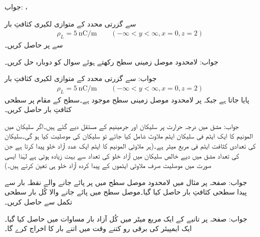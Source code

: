 جواب: ، 


 سے گزرتی  محدد کے متوازی لکیری کثافتِ بار
\begin{align*}
\rho_L=\SI{5}{\nano \coulomb \per \meter}  \quad \quad (-\infty < y < \infty, x=0,z=2)
\end{align*} 
سے  پر  حاصل کریں۔

جواب:
لامحدود موصل زمینی سطح   رکھتے ہوئے  سوال  کو دوبارہ حل کریں۔

جواب:
 سے گزرتی  محدد کے متوازی لکیری کثافتِ بار
\begin{align*}
\rho_L=\SI{5}{\nano \coulomb \per \meter}  \quad \quad (-\infty < y < \infty, x=0,z=2)
\end{align*} 
پایا جاتا ہے جبکہ  پر لامحدود موصل زمینی سطح موجود ہے۔سطح کے  مقام پر سطحی کثافتِ بار حاصل کریں۔

جواب: 
مشق  میں  درجہ حرارت پر  سلیکان اور جرمینیم کے مستقل دیے گئے ہیں۔اگر سلیکان میں المونیم کا ایک ایٹم فی   سلیکان ایٹم  ملاوٹ شامل کیا جائے تو سلیکان کی موصلیت کیا ہو گی۔سلیکان کی تعدادی کثافت  ایٹم فی مربع میٹر ہے۔(ہر ملاوٹی المونیم کا  ایٹم ایک عدد آزاد خلو پیدا کرتا ہے جن  کی تعداد مشق میں دیے خالص سلیکان میں آزاد خلو کی تعداد سے بہت زیادہ ہوتی ہے لہٰذا ایسی صورت میں موصلیت صرف ملاوٹی ایٹموں کے پیدا کردہ آزاد خلو ہی تعین کرتے ہیں۔) 

جواب: 
صفحہ  پر مثال  میں لامحدود موصل سطح  میں  پر پائے جانے والے نقطہ بار  سے پیدا سطحی کثافتِ بار  حاصل کیا گیا۔موصل سطح میں پائے جانے والا کُل بار سطحی تکمل سے حاصل کریں۔

جواب:  
صفحہ  پر تانبے کے ایک مربع میٹر میں کُل آزاد بار مساوات  میں حاصل کیا گیا۔ایک ایمپیئر کی برقی رو کتنے وقت میں اتنے بار کا اخراج کرے گا۔

